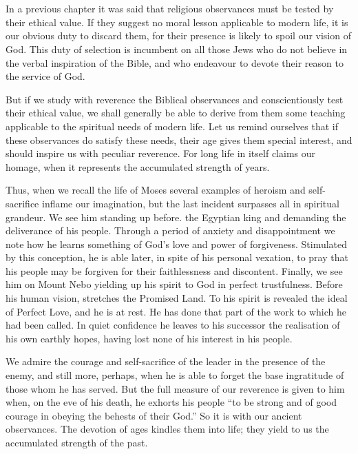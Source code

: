 \chapter{}

In a previous chapter it was said that religious
observances must be tested by their
ethical value. If they suggest no moral
lesson applicable to modern life, it is our
obvious duty to discard them, for their
presence is likely to spoil our vision of God.
This duty of selection is incumbent on all
those Jews who do not believe in the verbal
inspiration of the Bible, and who endeavour
to devote their reason to the service of
God.

But if we study with reverence the Biblical
observances and conscientiously test their
ethical value, we shall generally be able to
derive from them some teaching applicable to
the spiritual needs of modern life. Let us remind
ourselves that if these observances do
satisfy these needs, their age gives them
special interest, and should inspire us with
peculiar reverence. For long life in itself
claims our homage, when it represents the
accumulated strength of years.

Thus, when we recall the life of Moses
several examples of heroism and self-sacrifice
inflame our imagination, but the
last incident surpasses all in spiritual
grandeur. We see him standing up before.
the Egyptian king and demanding the
deliverance of his people. Through a period
of anxiety and disappointment we note how
he learns something of God’s love and
power of forgiveness. Stimulated by this
conception, he is able later, in spite of his
personal vexation, to pray that his people
may be forgiven for their faithlessness and
discontent. Finally, we see him on Mount
Nebo yielding up his spirit to God in
perfect trustfulness. Before his human
vision, stretches the Promised Land. To his
spirit is revealed the ideal of Perfect Love,
and he is at rest. He has done that part
of the work to which he had been called.
In quiet confidence he leaves to his successor
the realisation of his own earthly hopes,
having lost none of his interest in his
people.

We admire the courage and self-sacrifice
of the leader in the presence of the enemy,
and still more, perhaps, when he is able to
forget the base ingratitude of those whom
he has served. But the full measure of our
reverence is given to him when, on the
eve of his death, he exhorts his people “to
be strong and of good courage in obeying
the behests of their God.” So it is with
our ancient observances. The devotion
of ages kindles them into life; they
yield to us the accumulated strength of
the past.

